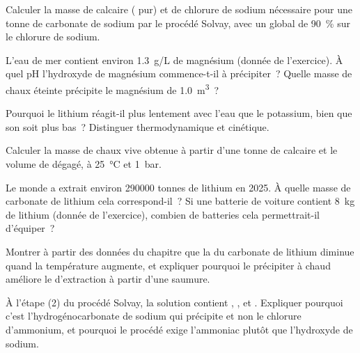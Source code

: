 \begin{exercise}[$\star\star$]\label{exo:b1:s-block:6}
Calculer la masse de calcaire ( pur) et de chlorure de sodium
nécessaire pour une tonne de carbonate de sodium par le procédé Solvay,
avec un  global de \qty{90}{\percent} sur le chlorure de
sodium.
\end{exercise}

\begin{exercise}[$\star\star$]\label{exo:b1:s-block:7}
L'eau de mer contient environ \qty{1.3}{g/L} de magnésium (donnée de
l'exercice). À quel pH l'hydroxyde de magnésium commence-t-il à
précipiter~? Quelle masse de chaux éteinte précipite le magnésium de
\qty{1.0}{m^3}~?
\end{exercise}

\begin{exercise}[$\star\star$]\label{exo:b1:s-block:8}
Pourquoi le lithium réagit-il plus lentement avec l'eau que le
potassium, bien que son  soit plus bas~? Distinguer
thermodynamique et cinétique.
\end{exercise}

\begin{exercise}[$\star\star$]\label{exo:b1:s-block:9}
Calculer la masse de chaux vive obtenue à partir d'une tonne de calcaire
et le volume de  dégagé, à \qty{25}{\celsius} et \qty{1}{bar}.
\end{exercise}

\begin{exercise}[$\star\star\star$]\label{exo:b1:s-block:10}
Le monde a extrait environ \num{290000} tonnes de lithium en 2025. À
quelle masse de carbonate de lithium cela correspond-il~? Si une
batterie de voiture contient \qty{8}{kg} de
lithium (donnée de l'exercice), combien de batteries cela
permettrait-il d'équiper~?
\end{exercise}

\begin{exercise}[$\star\star\star$]\label{exo:b1:s-block:11}
Montrer à partir des données du chapitre que la  du carbonate
de lithium diminue quand la température augmente, et expliquer pourquoi
le précipiter à chaud améliore le  d'extraction à partir d'une
saumure.
\end{exercise}

\begin{exercise}[$\star\star\star$]\label{exo:b1:s-block:12}
À l'étape (2) du procédé Solvay, la solution contient ,
,  et . Expliquer pourquoi c'est
l'hydrogénocarbonate de sodium qui précipite et non le chlorure
d'ammonium, et pourquoi le procédé exige l'ammoniac plutôt que
l'hydroxyde de sodium.
\end{exercise}


